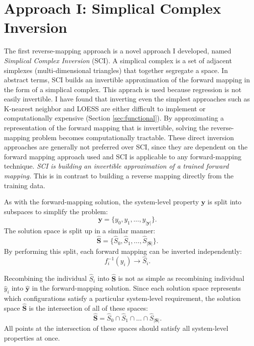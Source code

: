 \section{\fw Approach I: Simplical Complex Inversion}
The first \fw reverse-mapping approach is a novel approach I developed, named \textit{Simplical Complex Inversion} (SCI).
A simplical complex is a set of adjacent simplexes (multi-dimensional triangles) that together segregate a space.
In abstract terms, SCI builds an invertible approximation of the forward mapping in the form of a simplical complex.
This apprach is used because regression is not easily invertible.
I have found that inverting even the simplest approaches such as K-nearest neighbor and LOESS are either difficult to implement or computationally expensive (Section \ref{sec:functional}).
By approximating a representation of the forward mapping that is invertible, solving the reverse-mapping problem becomes computationally tractable.
These direct inversion approaches are generally not preferred over SCI, since they are dependent on the forward mapping approach used and SCI is applicable to any forward-mapping technique.
\textit{SCI is building an invertible approximation of a trained forward mapping.}
This is in contrast to building a reverse mapping directly from the training data.

As with the forward-mapping solution, the system-level property $\mathbf y$ is split into subspaces to simplify the problem:
\[ \mathbf y = \{y_0, y_1, \ldots, y_{|\mathbf y|}\}. \]
The solution space is split up in a similar manner:
\[ \hat{\mathbf S} = \{\hat S_0, \hat S_1, \ldots, \hat S_{|\mathbf S|}\}. \]
By performing this split, each forward mapping can be inverted independently:
\[ f^{-1}_i(y_i) \rightarrow \hat S_i. \]

Recombining the individual $\hat S_i$ into $\hat{\mathbf S}$ is not as simple as recombining individual $\hat y_i$ into $\hat{\mathbf y}$ in the forward-mapping solution.
Since each solution space represents which configurations satisfy a particular system-level requirement, the solution space $\hat{\mathbf S}$ is the intersection of all of these spaces:
\[ \hat{\mathbf S} = \hat S_0 \cap \hat S_1 \cap \ldots \cap \hat S_{|\mathbf S|}.\]
All points at the intersection of these spaces should satisfy all system-level properties at once.

